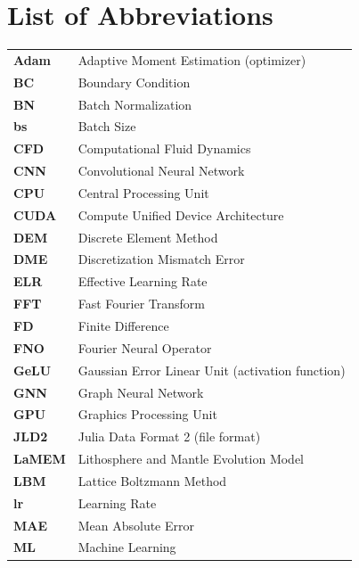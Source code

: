 
\chapter*{List of Abbreviations}

\begin{tabular}{@{}p{3cm}p{11cm}@{}}
    \textbf{Adam}   & Adaptive Moment Estimation (optimizer) \\
    \textbf{BC}     & Boundary Condition \\
    \textbf{BN}     & Batch Normalization \\
    \textbf{bs}     & Batch Size \\
    \textbf{CFD}    & Computational Fluid Dynamics \\
    \textbf{CNN}    & Convolutional Neural Network \\
    \textbf{CPU}    & Central Processing Unit \\
    \textbf{CUDA}   & Compute Unified Device Architecture \\
    \textbf{DEM}    & Discrete Element Method \\
    \textbf{DME}    & Discretization Mismatch Error \\
    \textbf{ELR}    & Effective Learning Rate \\
    \textbf{FFT}    & Fast Fourier Transform \\
    \textbf{FD}     & Finite Difference \\
    \textbf{FNO}    & Fourier Neural Operator \\
    \textbf{GeLU}   & Gaussian Error Linear Unit (activation function) \\
    \textbf{GNN}    & Graph Neural Network \\
    \textbf{GPU}    & Graphics Processing Unit \\
    \textbf{JLD2}   & Julia Data Format 2 (file format) \\
    \textbf{LaMEM}  & Lithosphere and Mantle Evolution Model \\
    \textbf{LBM}    & Lattice Boltzmann Method \\
    \textbf{lr}     & Learning Rate \\
    \textbf{MAE}    & Mean Absolute Error \\
    \textbf{ML}     & Machine Learning \\

\end{tabular}
